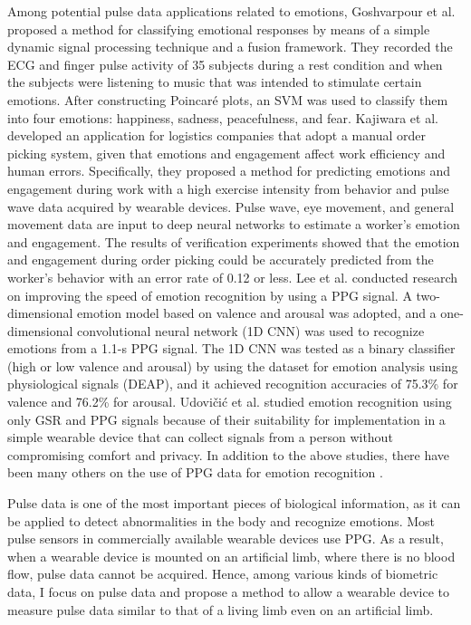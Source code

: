 Among potential pulse data applications related to emotions, Goshvarpour et al. \cite{emotion_recognition1} proposed a method for classifying emotional responses by means of a simple dynamic signal processing technique and a fusion framework. They recorded the ECG and finger pulse activity of 35 subjects during a rest condition and when the subjects were listening to music that was intended to stimulate certain emotions. After constructing Poincar\'e plots, an SVM was used to classify them into four emotions: happiness, sadness, peacefulness, and fear. Kajiwara et al. \cite{emotion_recognition2} developed an application for logistics companies that adopt a manual order picking system, given that emotions and engagement affect work efficiency and human errors. Specifically, they proposed a method for predicting emotions and engagement during work with a high exercise intensity from behavior and pulse wave data acquired by wearable devices. Pulse wave, eye movement, and general movement data are input to deep neural networks to estimate a worker's emotion and engagement. The results of verification experiments showed that the emotion and engagement during order picking could be accurately predicted from the worker's behavior with an error rate of 0.12 or less. Lee et al. \cite{emotion_recognition3} conducted research on improving the speed of emotion recognition by using a PPG signal. A two-dimensional emotion model based on valence and arousal was adopted, and a one-dimensional convolutional neural network (1D CNN) was used to recognize emotions from a 1.1-s PPG signal. The 1D CNN was tested as a binary classifier (high or low valence and arousal) by using the dataset for emotion analysis using physiological signals (DEAP), and it achieved recognition accuracies of 75.3\% for valence and 76.2\% for arousal. Udovi\v{c}i\'{c} et al. \cite{emotion_recognition4} studied emotion recognition using only GSR and PPG signals because of their suitability for implementation in a simple wearable device that can collect signals from a person without compromising comfort and privacy. In addition to the above studies, there have been many others on the use of PPG data for emotion recognition \cite{emotion_recognition5, emotion_recognition6, emotion_recognition7}.\par

Pulse data is one of the most important pieces of biological information, as it can be applied to detect abnormalities in the body and recognize emotions. Most pulse sensors in commercially available wearable devices use PPG. As a result, when a wearable device is mounted on an artificial limb, where there is no blood flow, pulse data cannot be acquired. Hence, among various kinds of biometric data, I focus on pulse data and propose a method to allow a wearable device to measure pulse data similar to that of a living limb even on an artificial limb.
